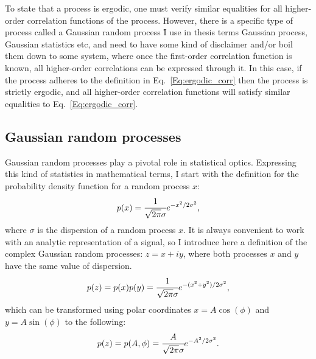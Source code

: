    To state that a process is ergodic, one must verify similar equalities for all higher-order correlation functions of the process. However, there is a specific type of process called a Gaussian random process \r{I use in thesis terms Gaussian process, Gaussian statistics etc, and need to have some kind of disclaimer and/or boil them down to some system}, where once the first-order correlation function is known, all higher-order correlations can be expressed through it. In this case, if the process adheres to the definition in Eq.~\ref{Eq:ergodic_corr} then the process is strictly ergodic, and all higher-order correlation functions will satisfy similar equalities to Eq.~\ref{Eq:ergodic_corr}.

    \subsection{Gaussian random processes}
    \label{Sec:Gaussian random processes}
    Gaussian random processes play a pivotal role in statistical optics. Expressing this kind of statistics in mathematical terms, I start with the definition for the probability density function for a random process $x$:
    \begin{align}
        p(x) = \cfrac{1}{\sqrt{2 \pi}\sigma} e^{-x^2/2\sigma^2},
    \end{align}
    where $\sigma$ is the dispersion of a random process $x$. It is always convenient to work with an analytic representation of a signal, so I introduce here a definition of the complex Gaussian random processes: $z = x + iy$, where both processes $x$ and $y$ have the same value of dispersion.
    \begin{align}
        p(z) = p(x)p(y) = \cfrac{1}{\sqrt{2 \pi}\sigma} e^{-(x^2 + y^2)/2\sigma^2},
    \end{align}
    which can be transformed using polar coordinates $x = A\cos(\phi)$ and $y = A\sin(\phi)$ to the following:
    \begin{align}
        p(z) = p(A, \phi) = \cfrac{A}{\sqrt{2 \pi}\sigma} e^{-A^2/2\sigma^2}.
    \end{align}
